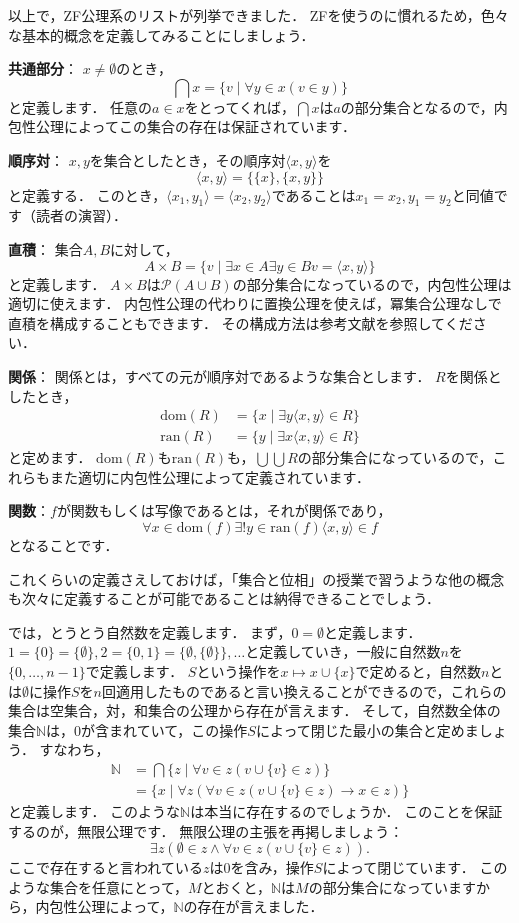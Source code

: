 \documentclass[./main]{subfiles}
\newcommand{\tbf}{\textbf}
\newcommand{\mbb}{\mathbb}
\newcommand{\mcl}{\mathcal}
\begin{document}
以上で，ZF公理系のリストが列挙できました．
ZFを使うのに慣れるため，色々な基本的概念を定義してみることにしましょう．

\tbf{共通部分}：
$x\neq\emptyset$のとき，
\[
\bigcap x=\{v\mid\forall y\in x(v\in y)\}
\]
と定義します．
任意の$a\in x$をとってくれば，$\bigcap x$は$a$の部分集合となるので，内包性公理によってこの集合の存在は保証されています．

\tbf{順序対}：
$x, y$を集合としたとき，その順序対$\langle x, y \rangle$を
\[
\langle x, y\rangle=\{\{x\}, \{x, y\}\}
\]
と定義する．
このとき，$\langle x_1, y_1\rangle=\langle x_2, y_2\rangle$であることは$x_1=x_2, y_1=y_2$と同値です（読者の演習）．

\tbf{直積}：
集合$A, B$に対して，
\[
A\times B=\{v \mid \exists x\in A\exists y\in B v=\langle x, y\rangle\}
\]
と定義します．
$A\times B$は$\mcl{P}(A\cup B)$の部分集合になっているので，内包性公理は適切に使えます．
内包性公理の代わりに置換公理を使えば，冪集合公理なしで直積を構成することもできます．
その構成方法は参考文献を参照してください．

\tbf{関係}：
関係とは，すべての元が順序対であるような集合とします．
$R$を関係としたとき，
\begin{align*}
\text{dom}(R) &=\{x\mid\exists y \langle x, y\rangle\in R\}\\
\text{ran}(R) &=\{y\mid\exists x \langle x,y\rangle\in R\}
\end{align*}
と定めます．
$\text{dom}(R)$も$\text{ran}(R)$も，$\bigcup\bigcup R$の部分集合になっているので，これらもまた適切に内包性公理によって定義されています．

\tbf{関数}：$f$が関数もしくは写像であるとは，それが関係であり，
\[
\forall x\in\text{dom}(f)\exists ! y\in\text{ran}(f)\langle x,y\rangle\in f
\]
となることです．

これくらいの定義さえしておけば，「集合と位相」の授業で習うような他の概念も次々に定義することが可能であることは納得できることでしょう．


では，とうとう自然数を定義します．
まず，$0=\emptyset$と定義します．
$1=\{0\}=\{\emptyset\}, 2=\{0, 1\}=\{\emptyset,\{\emptyset\}\},\ldots$と定義していき，一般に自然数$n$を$\{0,\ldots,n-1\}$で定義します．
$S$という操作を$x\mapsto x\cup\{x\}$で定めると，自然数$n$とは$\emptyset$に操作$S$を$n$回適用したものであると言い換えることができるので，これらの集合は空集合，対，和集合の公理から存在が言えます．
そして，自然数全体の集合$\mbb{N}$は，$0$が含まれていて，この操作$S$によって閉じた最小の集合と定めましょう．
すなわち，
\begin{align*}
\mbb{N} &=\bigcap\{z\mid\forall v\in z(v\cup\{v\}\in z)\}\\
&=\{x\mid\forall z(\forall v\in z(v\cup\{v\}\in z)\to x\in z)\}
\end{align*}
と定義します．
このような$\mbb{N}$は本当に存在するのでしょうか．
このことを保証するのが，無限公理です．
無限公理の主張を再掲しましょう：
\[
\exists z(\emptyset\in z\wedge\forall v\in z(v\cup\{v\}\in z)).
\]
ここで存在すると言われている$z$は0を含み，操作$S$によって閉じています．
このような集合を任意にとって，$M$とおくと，$\mbb{N}$は$M$の部分集合になっていますから，内包性公理によって，$\mbb{N}$の存在が言えました．
\end{document}
